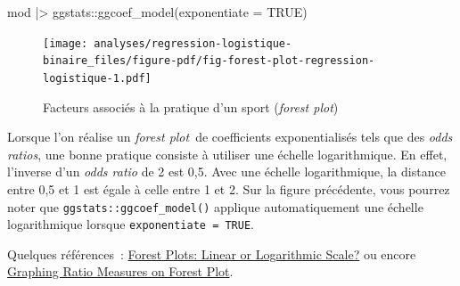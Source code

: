\documentclass[
  letterpaper,
  DIV=11,
  numbers=noendperiod,
  oneside]{scrreprt}
\newenvironment{Shaded}{\begin{snugshade}}{\end{snugshade}}
\newcommand{\AttributeTok}[1]{\textcolor[rgb]{0.40,0.45,0.13}{#1}}
\newcommand{\ConstantTok}[1]{\textcolor[rgb]{0.56,0.35,0.01}{#1}}
\newcommand{\FunctionTok}[1]{\textcolor[rgb]{0.28,0.35,0.67}{#1}}
\newcommand{\NormalTok}[1]{\textcolor[rgb]{0.00,0.23,0.31}{#1}}
\newcommand{\SpecialCharTok}[1]{\textcolor[rgb]{0.37,0.37,0.37}{#1}}
\begin{document}
\begin{Shaded}
\begin{Highlighting}[]
\NormalTok{mod }\SpecialCharTok{|\textgreater{}} 
\NormalTok{  ggstats}\SpecialCharTok{::}\FunctionTok{ggcoef\_model}\NormalTok{(}\AttributeTok{exponentiate =} \ConstantTok{TRUE}\NormalTok{)}
\end{Highlighting}
\end{Shaded}

\begin{figure}[H]

{\centering \texttt{[image: analyses/regression-logistique-binaire\_files/figure-pdf/fig-forest-plot-regression-logistique-1.pdf]}

}

\caption{\label{fig-forest-plot-regression-logistique}Facteurs associés
à la pratique d'un sport (\emph{forest plot})}

\end{figure}

\begin{tcolorbox}[enhanced jigsaw, colbacktitle=quarto-callout-note-color!10!white, opacityback=0, toprule=.15mm, colback=white, coltitle=black, bottomtitle=1mm, toptitle=1mm, titlerule=0mm, rightrule=.15mm, title=\textcolor{quarto-callout-note-color}{\faInfo}\hspace{0.5em}{Note}, breakable, bottomrule=.15mm, opacitybacktitle=0.6, arc=.35mm, left=2mm, leftrule=.75mm, colframe=quarto-callout-note-color-frame]

Lorsque l'on réalise un \emph{forest plot}~de coefficients
exponentialisés tels que des \emph{odds ratios}, une bonne pratique
consiste à utiliser une échelle logarithmique. En effet, l'inverse d'un
\emph{odds ratio} de 2 est 0,5. Avec une échelle logarithmique, la
distance entre 0,5 et 1 est égale à celle entre 1 et 2. Sur la figure
précédente, vous pourrez noter que \texttt{ggstats::ggcoef\_model()}
applique automatiquement une échelle logarithmique lorsque
\texttt{exponentiate\ =\ TRUE}.

Quelques références~:
\href{https://doi.org/10.1016/j.jadohealth.2017.07.025}{Forest Plots:
Linear or Logarithmic Scale?} ou encore
\href{https://doi.org/10.1016/j.jacc.2017.10.098}{Graphing Ratio
Measures on Forest Plot}.

\end{tcolorbox}
\end{document}

